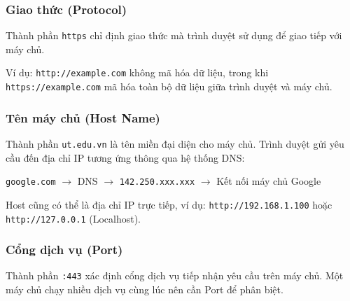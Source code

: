 \documentclass[11pt,oneside]{book}
\newcommand{\thd}[1]{\textcolor{white}{\textbf{\strut #1}}}
\newcommand{\codeinline}[1]{\textcolor{accentOrange}{\texttt{#1}}}
\begin{document}
\subsubsection{Giao thức (Protocol)}
Thành phần \codeinline{https} chỉ định giao thức mà trình duyệt sử dụng để giao tiếp với máy chủ.

\begin{prettyTableBox}
\end{prettyTableBox}

Ví dụ: \codeinline{http://example.com} không mã hóa dữ liệu, trong khi \codeinline{https://example.com} mã hóa toàn bộ dữ liệu giữa trình duyệt và máy chủ.

\subsubsection{Tên máy chủ (Host Name)}
Thành phần \codeinline{ut.edu.vn} là tên miền đại diện cho máy chủ. Trình duyệt gửi yêu cầu đến địa chỉ IP tương ứng thông qua hệ thống DNS:
\begin{center}
\codeinline{google.com} \quad $\rightarrow$ \quad DNS \quad $\rightarrow$ \quad \codeinline{142.250.xxx.xxx} \quad $\rightarrow$ \quad Kết nối máy chủ Google
\end{center}
Host cũng có thể là địa chỉ IP trực tiếp, ví dụ: \codeinline{http://192.168.1.100} hoặc \codeinline{http://127.0.0.1} (Localhost).

\subsubsection{Cổng dịch vụ (Port)}
Thành phần \codeinline{:443} xác định cổng dịch vụ tiếp nhận yêu cầu trên máy chủ. Một máy chủ chạy nhiều dịch vụ cùng lúc nên cần Port để phân biệt.
\end{document}
